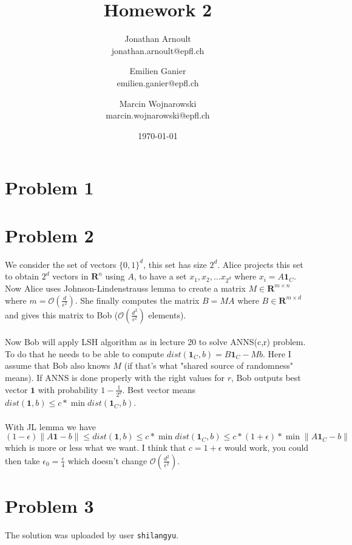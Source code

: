 \documentclass[a4paper, 11pt]{article}
\title{Homework 2}
\author{
    Jonathan Arnoult \\ jonathan.arnoult@epfl.ch
    \and Emilien Ganier \\ emilien.ganier@epfl.ch
    \and Marcin Wojnarowski \\ marcin.wojnarowski@epfl.ch
}
\date{\today}
\begin{document}
\maketitle

\section*{Problem 1}


\newpage

\section*{Problem 2}

We consider the set of vectors $\{ 0,1\} ^d$, this set has size $2^d$. Alice projects this set to obtain $2^d$ vectors in $\mathbf{R}^n$ using $A$, to have a set $x_1,x_2,\dots x_{2^d}$ where $x_i=A\mathbf{1}_C$. Now Alice uses Johnson-Lindenstrauss lemma to create a matrix $M\in \mathbf{R}^{m\times n}$ where $m=\mathcal{O}\left(\frac{d}{\epsilon^2}\right)$. She finally computes the matrix $B=MA$ where $B\in \mathbf{R}^{m\times d}$ and gives this matrix to Bob ($\mathcal{O}\left(\frac{d^2}{\epsilon^2}\right)$ elements).
\\\\
Now Bob will apply LSH algorithm as in lecture 20 to solve ANNS(c,r) problem. To do that he needs to be able to compute $dist(\mathbf{1}_C,b) = B\mathbf{1}_C-Mb$. Here I assume that Bob also knows $M$ (if that's what "shared source of randomness" means). If ANNS is done properly with the right values for $r$, Bob outputs best vector $\mathbf{1}$ with probability $1-\frac{1}{2^d}$. Best vector means $dist(\mathbf{1},b)\leq c*\min dist(\mathbf{1}_C,b)$.
\\\\
With JL lemma we have $$(1-\epsilon)\|A\mathbf{1}-b\|\leq dist(\mathbf{1},b)\leq c*\min dist(\mathbf{1}_C,b)\leq c*(1+\epsilon)*\min \|A\mathbf{1}_C-b\|$$ which is more or less what we want. I think that $c=1+\epsilon$ would work, you could then take $\epsilon_0=\frac{\epsilon}{4}$ which doesn't change $\mathcal{O}\left(\frac{d^2}{\epsilon^2}\right)$.

\newpage

\section*{Problem 3}

The solution was uploaded by user \texttt{shilangyu}.
\end{document}
